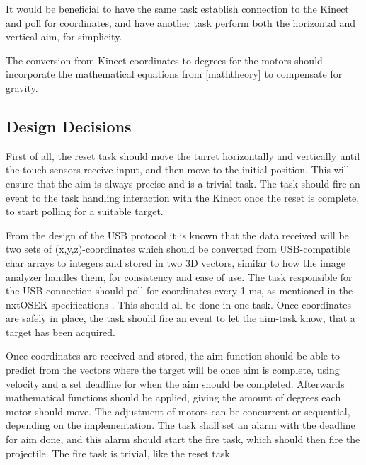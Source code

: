 It would be beneficial to have the same task establish connection to the Kinect and poll for coordinates, and have another task perform both the horizontal and vertical aim, for simplicity.

The conversion from Kinect coordinates to degrees for the motors should incorporate the mathematical equations from \autoref{maththeory} to compensate for gravity.

\subsection{Design Decisions}
First of all, the reset task should move the turret horizontally and vertically until the touch sensors receive input, and then move to the initial position. This will ensure that the aim is always precise and is a trivial task. The task should fire an event to the task handling interaction with the Kinect once the reset is complete, to start polling for a suitable target.

From the design of the USB protocol it is known that the data received will be two sets of (x,y,z)-coordinates which should be converted from USB-compatible char arrays to integers and stored in two 3D vectors, similar to how the image analyzer handles them, for consistency and ease of use. The task responsible for the USB connection should poll for coordinates every 1 ms, as mentioned in the nxtOSEK specifications \cite{osek_spec}. This should all be done in one task. Once coordinates are safely in place, the task should fire an event to let the aim-task know, that a target has been acquired.

Once coordinates are received and stored, the aim function should be able to predict from the vectors where the target will be once aim is complete, using velocity and a set deadline for when the aim should be completed. Afterwards mathematical functions should be applied, giving the amount of degrees each motor should move. The adjustment of motors can be concurrent or sequential, depending on the implementation. The task shall set an alarm with the deadline for aim done, and this alarm should start the fire task, which should then fire the projectile. The fire task is trivial, like the reset task.

